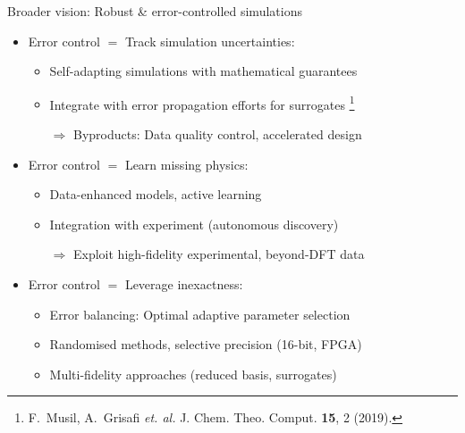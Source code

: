 \begin{frame}{Broader vision: Robust \& error-controlled simulations}
\begin{itemize}
    \item Error control $=$ \alert{Track simulation uncertainties}:
        \begin{itemize}
            \vspace{-0.30em}
            \item Self-adapting simulations with mathematical guarantees
            \vspace{-0.30em}
            \item Integrate with error propagation efforts for surrogates%
                \footnote{F.~Musil, A.~Grisafi \emph{et. al.} J. Chem. Theo. Comput. \textbf{15}, 2 (2019).}
            \vspace{-0.30em}
            \item [$\Rightarrow$] Byproducts: Data quality control,
                accelerated design%
        \end{itemize}

    \vspace{0.3em}
    \item Error control $=$ \alert{Learn missing physics}:
        \begin{itemize}
            \vspace{-0.30em}
            \item Data-enhanced models, active learning
            \vspace{-0.30em}
            \item Integration with experiment {\color{grey5} (autonomous discovery)}
            \vspace{-0.30em}
            \item [$\Rightarrow$] Exploit high-fidelity experimental, beyond-DFT data
        \end{itemize}

    \vspace{0.3em}
    \item Error control $=$ \alert{Leverage inexactness}:
        \begin{itemize}
            \vspace{-0.30em}
            \item Error balancing: Optimal adaptive parameter selection
            \vspace{-0.30em}
            \item Randomised methods, selective precision {\color{grey5} (16-bit, FPGA)}
            \vspace{-0.30em}
            \item Multi-fidelity approaches {\color{grey5} (reduced basis, surrogates)}
        \end{itemize}


\end{itemize}
\end{frame}
